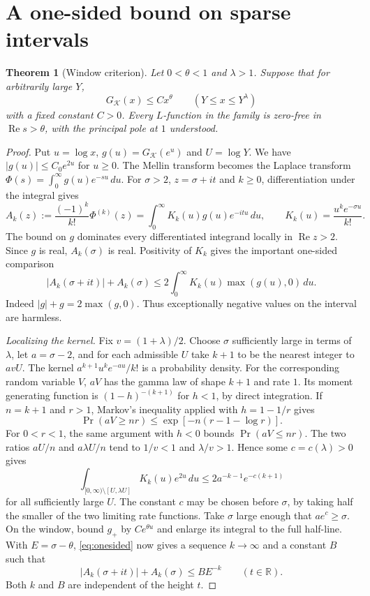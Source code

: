 \documentclass[11pt,a4paper]{article}
\newtheorem{theorem}{Theorem}[section]\newtheorem{lemma}[theorem]{Lemma}\newtheorem{prop}[theorem]{Proposition}\newtheorem{cor}[theorem]{Corollary}
\theoremstyle{definition}\newtheorem{arithinput}[theorem]{Arithmetic input}
\newcommand{\R}{\mathbb R}\newcommand{\C}{\mathbb C}\newcommand{\Z}{\mathbb Z}\newcommand{\Q}{\mathbb Q}
\newcommand{\re}{\operatorname{Re}}\newcommand{\im}{\operatorname{Im}}\newcommand{\Res}{\operatorname*{Res}}\newcommand{\rank}{\operatorname{rk}}
\begin{document}
\section{A one-sided bound on sparse intervals}\label{sec:landau}
\begin{theorem}[Window criterion]\label{th:landau}
Let $0<\theta<1$ and $\lambda>1$. Suppose that for arbitrarily large $Y$,
\[
 G_{\mathcal K}(x)\le Cx^\theta\qquad(Y\le x\le Y^\lambda)
\]
with a fixed constant $C>0$. Every $L$-function in the family is zero-free in $\re s>\theta$, with the principal pole at $1$ understood.
\end{theorem}
\begin{proof}
Put $u=\log x$, $g(u)=G_{\mathcal K}(e^u)$ and $U=\log Y$. We have $|g(u)|\le C_0e^{2u}$ for $u\ge0$. The Mellin transform becomes the Laplace transform $\Phi(s)=\int_0^\infty g(u)e^{-su}\,du$. For $\sigma>2$, $z=\sigma+it$ and $k\ge0$, differentiation under the integral gives
\[
 A_k(z):=\frac{(-1)^k}{k!}\Phi^{(k)}(z)=
 \int_0^\infty K_k(u)g(u)e^{-itu}\,du,\qquad K_k(u)=\frac{u^k e^{-\sigma u}}{k!}.
\]
The bound on $g$ dominates every differentiated integrand locally in $\re z>2$. Since $g$ is real, $A_k(\sigma)$ is real. Positivity of $K_k$ gives the important one-sided comparison
\begin{equation}
 |A_k(\sigma+it)|+A_k(\sigma)\le 2\int_0^\infty K_k(u)\max(g(u),0)\,du.\label{eq:onesided}
\end{equation}
Indeed $|g|+g=2\max(g,0)$. Thus exceptionally negative values on the interval are harmless.

\smallskip\noindent\textit{Localizing the kernel.}
Fix $v=(1+\lambda)/2$. Choose $\sigma$ sufficiently large in terms of $\lambda$, let $a=\sigma-2$, and for each admissible $U$ take $k+1$ to be the nearest integer to $avU$. The kernel $a^{k+1}u^ke^{-au}/k!$ is a probability density. For the corresponding random variable $V$, $aV$ has the gamma law of shape $k+1$ and rate $1$. Its moment generating function is $(1-h)^{-(k+1)}$ for $h<1$, by direct integration. If $n=k+1$ and $r>1$, Markov's inequality applied with $h=1-1/r$ gives
\[
 \Pr(aV\ge nr)\le \exp[-n(r-1-\log r)].
\]
For $0<r<1$, the same argument with $h<0$ bounds $\Pr(aV\le nr)$. The two ratios $aU/n$ and $a\lambda U/n$ tend to $1/v<1$ and $\lambda/v>1$. Hence some $c=c(\lambda)>0$ gives
\[
 \int_{[0,\infty)\setminus[U,\lambda U]}K_k(u)e^{2u}\,du
 \le 2a^{-k-1}e^{-c(k+1)}
\]
for all sufficiently large $U$. The constant $c$ may be chosen before $\sigma$, by taking half the smaller of the two limiting rate functions. Take $\sigma$ large enough that $ae^c\ge\sigma$. On the window, bound $g_+$ by $Ce^{\theta u}$ and enlarge its integral to the full half-line. With $E=\sigma-\theta$, \eqref{eq:onesided} now gives a sequence $k\to\infty$ and a constant $B$ such that
\begin{equation}
 |A_k(\sigma+it)|+A_k(\sigma)\le B E^{-k}\qquad(t\in\R).\label{eq:key}
\end{equation}
Both $k$ and $B$ are independent of the height $t$.


\end{proof}
\end{document}
